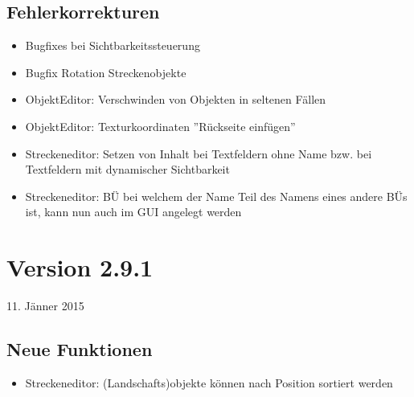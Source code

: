 \subsection{Fehlerkorrekturen}
\begin{itemize}
\item Bugfixes bei Sichtbarkeitssteuerung
\item Bugfix Rotation Streckenobjekte

\item ObjektEditor: Verschwinden von Objekten in seltenen Fällen
\item ObjektEditor: Texturkoordinaten ''Rückseite einfügen''

\item Streckeneditor: Setzen von Inhalt bei Textfeldern ohne Name bzw. bei Textfeldern mit dynamischer Sichtbarkeit
\item Streckeneditor: BÜ bei welchem der Name Teil des Namens eines andere BÜs ist, kann nun auch im GUI angelegt werden
\end{itemize}

\section{Version 2.9.1}\hfill 11. Jänner 2015

\subsection{Neue Funktionen}
\begin{itemize}
\item Streckeneditor: (Landschafts)objekte können nach Position sortiert werden
\end{itemize}

